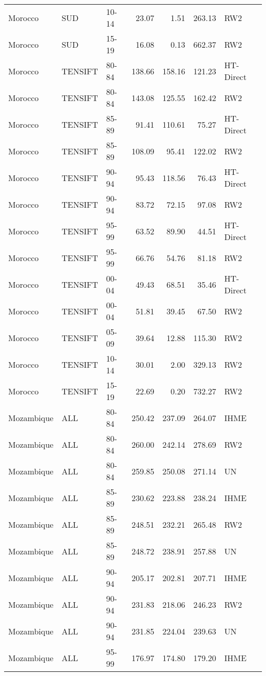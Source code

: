 \begin{longtable}{lllrrrl}
  Morocco & SUD & 10-14 & 23.07 & 1.51 & 263.13 & RW2 \\ 
  Morocco & SUD & 15-19 & 16.08 & 0.13 & 662.37 & RW2 \\ 
  Morocco & TENSIFT & 80-84 & 138.66 & 158.16 & 121.23 & HT-Direct \\ 
  Morocco & TENSIFT & 80-84 & 143.08 & 125.55 & 162.42 & RW2 \\ 
  Morocco & TENSIFT & 85-89 & 91.41 & 110.61 & 75.27 & HT-Direct \\ 
  Morocco & TENSIFT & 85-89 & 108.09 & 95.41 & 122.02 & RW2 \\ 
  Morocco & TENSIFT & 90-94 & 95.43 & 118.56 & 76.43 & HT-Direct \\ 
  Morocco & TENSIFT & 90-94 & 83.72 & 72.15 & 97.08 & RW2 \\ 
  Morocco & TENSIFT & 95-99 & 63.52 & 89.90 & 44.51 & HT-Direct \\ 
  Morocco & TENSIFT & 95-99 & 66.76 & 54.76 & 81.18 & RW2 \\ 
  Morocco & TENSIFT & 00-04 & 49.43 & 68.51 & 35.46 & HT-Direct \\ 
  Morocco & TENSIFT & 00-04 & 51.81 & 39.45 & 67.50 & RW2 \\ 
  Morocco & TENSIFT & 05-09 & 39.64 & 12.88 & 115.30 & RW2 \\ 
  Morocco & TENSIFT & 10-14 & 30.01 & 2.00 & 329.13 & RW2 \\ 
  Morocco & TENSIFT & 15-19 & 22.69 & 0.20 & 732.27 & RW2 \\ 
  Mozambique & ALL & 80-84 & 250.42 & 237.09 & 264.07 & IHME \\ 
  Mozambique & ALL & 80-84 & 260.00 & 242.14 & 278.69 & RW2 \\ 
  Mozambique & ALL & 80-84 & 259.85 & 250.08 & 271.14 & UN \\ 
  Mozambique & ALL & 85-89 & 230.62 & 223.88 & 238.24 & IHME \\ 
  Mozambique & ALL & 85-89 & 248.51 & 232.21 & 265.48 & RW2 \\ 
  Mozambique & ALL & 85-89 & 248.72 & 238.91 & 257.88 & UN \\ 
  Mozambique & ALL & 90-94 & 205.17 & 202.81 & 207.71 & IHME \\ 
  Mozambique & ALL & 90-94 & 231.83 & 218.06 & 246.23 & RW2 \\ 
  Mozambique & ALL & 90-94 & 231.85 & 224.04 & 239.63 & UN \\ 
  Mozambique & ALL & 95-99 & 176.97 & 174.80 & 179.20 & IHME \\ 

\end{longtable}
